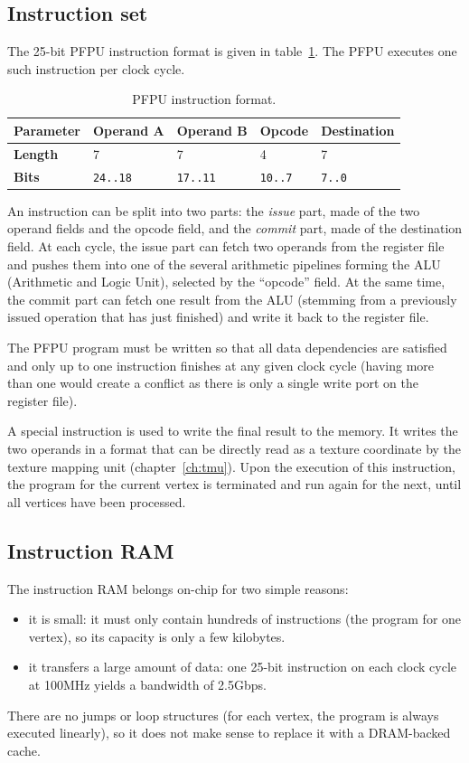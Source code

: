 \documentclass[a4paper,11pt]{kthesis}
\begin{document}
\subsection{Instruction set}
The 25-bit PFPU instruction format is given in table~\ref{tab:pfpuinst}. The PFPU executes one such instruction per clock cycle.

\begin{table}
\centering
\begin{tabular}{|l|l|l|l|l|}
\hline
\textbf{Parameter} & Operand A & Operand B & Opcode & Destination \\
\hline
\textbf{Length} & 7 & 7 & 4 & 7 \\
\hline
\textbf{Bits} & \verb!24..18! & \verb!17..11! & \verb!10..7! & \verb!7..0! \\
\hline
\end{tabular}
\caption{PFPU instruction format.}\label{tab:pfpuinst}
\end{table}

An instruction can be split into two parts: the \textit{issue} part, made of the two operand fields and the opcode field, and the \textit{commit} part, made of the destination field. At each cycle, the issue part can fetch two operands from the register file and pushes them into one of the several arithmetic pipelines forming the ALU (Arithmetic and Logic Unit), selected by the ``opcode'' field. At the same time, the commit part can fetch one result from the ALU (stemming from a previously issued operation that has just finished) and write it back to the register file.

The PFPU program must be written so that all data dependencies are satisfied and only up to one instruction finishes at any given clock cycle (having more than one would create a conflict as there is only a single write port on the register file).

A special instruction is used to write the final result to the memory. It writes the two operands in a format that can be directly read as a texture coordinate by the texture mapping unit (chapter~\ref{ch:tmu}). Upon the execution of this instruction, the program for the current vertex is terminated and run again for the next, until all vertices have been processed.

\subsection{Instruction RAM}
The instruction RAM belongs on-chip for two simple reasons:
\begin{itemize}
\item it is small: it must only contain hundreds of instructions (the program for one vertex), so its capacity is only a few kilobytes.
\item it transfers a large amount of data: one 25-bit instruction on each clock cycle at 100MHz yields a bandwidth of 2.5Gbps.
\end{itemize}
There are no jumps or loop structures (for each vertex, the program is always executed linearly), so it does not make sense to replace it with a DRAM-backed cache.
\end{document}
